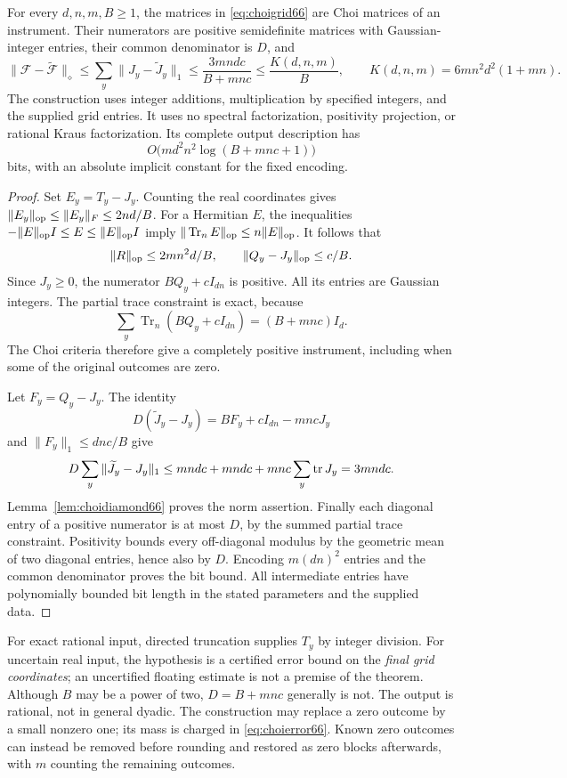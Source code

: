 \begin{theorem}\label{thm:choiround66}
For every $d,n,m,B\ge1$, the matrices in \eqref{eq:choigrid66} are
Choi matrices of an instrument. Their numerators are positive semidefinite matrices with Gaussian-integer entries, their common denominator is $D$, and
\begin{equation}\label{eq:choierror66}
 \|\mathcal F-\widetilde{\mathcal F}\|_\diamond
 \le\sum_y\|J_y-\widetilde J_y\|_1
 \le\frac{3mndc}{B+mnc}\le\frac{K(d,n,m)}B,
 \qquad K(d,n,m)=6mn^2d^2(1+mn).
\end{equation}
The construction uses integer additions, multiplication by specified
integers, and the supplied grid entries. It uses no spectral
factorization, positivity projection, or rational Kraus
factorization. Its complete output description has
\[
 O\bigl(m d^2n^2\log(B+mnc+1)\bigr)
\]
bits, with an absolute implicit constant for the fixed encoding.
\end{theorem}
\begin{proof}
Set $E_y=T_y-J_y$. Counting the real coordinates gives
$\|E_y\|_{\rm op}\le\|E_y\|_F\le2nd/B$.
For a Hermitian $E$, the inequalities
$-\|E\|_{\rm op}I\le E\le\|E\|_{\rm op}I$ imply
$\|\operatorname{Tr}_{n}E\|_{\rm op}\le n\|E\|_{\rm op}$.
It follows that
\[
 \|R\|_{\rm op}\le2mn^2d/B,\qquad
             \|Q_y-J_y\|_{\rm op}\le c/B.
\]
Since $J_y\ge0$, the numerator $BQ_y+cI_{dn}$ is positive.
All its entries are Gaussian integers. The partial trace constraint is
exact, because
\[
 \sum_y\operatorname{Tr}_{n}(BQ_y+cI_{dn})
                       =(B+mnc)I_d.
\]
The Choi criteria therefore give a completely positive instrument,
including when some of the original outcomes are zero.

Let $F_y=Q_y-J_y$. The identity
\[
 D(\widetilde J_y-J_y)=BF_y+cI_{dn}-mncJ_y
\]
and $\|F_y\|_1\le dn c/B$ give
\[
 D\sum_y\|\widetilde J_y-J_y\|_1
 \le mndc+mndc+mnc\sum_y\operatorname{tr} J_y=3mndc.
\]
Lemma~\ref{lem:choidiamond66} proves the norm assertion. Finally each
diagonal entry of a positive numerator is at most $D$, by the summed
partial trace constraint. Positivity bounds every off-diagonal modulus
by the geometric mean of two diagonal entries, hence also by $D$.
Encoding $m(dn)^2$ entries and the common denominator proves the
bit bound. All intermediate entries have polynomially bounded bit
length in the stated parameters and the supplied data.
\end{proof}

For exact rational input, directed truncation supplies $T_y$ by integer
division. For uncertain real input, the hypothesis is a certified error
bound on the \emph{final grid coordinates}; an uncertified floating
estimate is not a premise of the theorem. Although $B$ may be a power
of two, $D=B+mnc$ generally is not. The output is rational, not in
general dyadic. The construction may replace a zero outcome by a
small nonzero one; its mass is charged in \eqref{eq:choierror66}.
Known zero outcomes can instead be removed before rounding and restored
as zero blocks afterwards, with $m$ counting the remaining outcomes.

